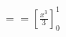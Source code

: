 \documentclass[preview]{standalone}
\begin{document}
\begin{align*}
== \left[\frac{x^3}{3}\right]_0^1
\end{align*}
\end{document}
